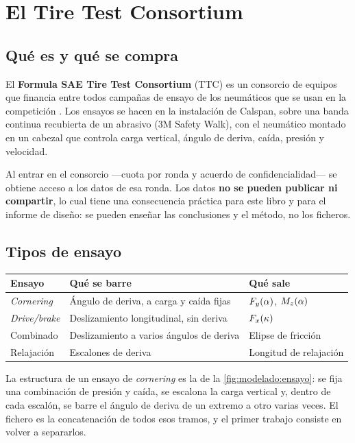 \section{El Tire Test Consortium}
\label{sec:modelado_neumatico:01}

\subsection{Qué es y qué se compra}

El \textbf{Formula SAE Tire Test Consortium} (TTC) es un consorcio de equipos
que financia entre todos campañas de ensayo de los neumáticos que se usan en la
competición \cite{ttc_data,kasprzak_ttc_2006}. Los ensayos se hacen en la
instalación de Calspan, sobre una banda continua recubierta de un abrasivo
(3M Safety Walk), con el neumático montado en un cabezal que controla carga
vertical, ángulo de deriva, caída, presión y velocidad.

Al entrar en el consorcio ---cuota por ronda y acuerdo de confidencialidad--- se
obtiene acceso a los datos de esa ronda. Los datos \textbf{no se pueden publicar
ni compartir}, lo cual tiene una consecuencia práctica para este libro y para el
informe de diseño: se pueden enseñar las conclusiones y el método, no los
ficheros.

\subsection{Tipos de ensayo}

\begin{center}
\begin{tabularx}{\textwidth}{@{}lXl@{}}
\toprule
\textbf{Ensayo} & \textbf{Qué se barre} & \textbf{Qué sale} \\
\midrule
\emph{Cornering} & Ángulo de deriva, a carga y caída fijas & $F_y(\alpha)$, $M_z(\alpha)$ \\
\emph{Drive/brake} & Deslizamiento longitudinal, sin deriva & $F_x(\kappa)$ \\
Combinado & Deslizamiento a varios ángulos de deriva & Elipse de fricción \\
Relajación & Escalones de deriva & Longitud de relajación \\
\bottomrule
\end{tabularx}
\end{center}

La estructura de un ensayo de \emph{cornering} es la de la
\cref{fig:modelado:ensayo}: se fija una combinación de presión y caída, se
escalona la carga vertical y, dentro de cada escalón, se barre el ángulo de
deriva de un extremo a otro varias veces. El fichero es la concatenación de todos
esos tramos, y el primer trabajo consiste en volver a separarlos.

